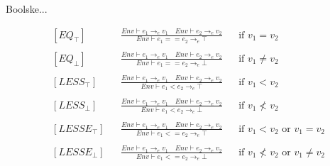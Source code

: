 \noindent Boolske...

\begin{align*}
&[EQ_\top] & &\frac{Env \vdash e_1 \rightarrow_e v_1 \quad Env \vdash e_2 \rightarrow_e v_2}{Env \vdash e_1 == e_2 \rightarrow_e \top} & &\text{if } v_1 = v_2\\\\
&[EQ_\bot] & &\frac{Env \vdash e_1 \rightarrow_e v_1 \quad Env \vdash e_2 \rightarrow_e v_2}{Env \vdash e_1 == e_2 \rightarrow_e \bot} & &\text{if } v_1 \ne v_2\\\\
&[LESS_\top] & &\frac{Env \vdash e_1 \rightarrow_e v_1 \quad Env \vdash e_2 \rightarrow_e v_2}{Env \vdash e_1 < e_2 \rightarrow_e \top} & &\text{if } v_1 < v_2\\\\
&[LESS_\bot] & &\frac{Env \vdash e_1 \rightarrow_e v_1 \quad Env \vdash e_2 \rightarrow_e v_2}{Env \vdash e_1 < e_2 \rightarrow_e \bot} & &\text{if } v_1 \nless v_2\\\\
&[LESSE_\top] & &\frac{Env \vdash e_1 \rightarrow_e v_1 \quad Env \vdash e_2 \rightarrow_e v_2}{Env \vdash e_1 <= e_2 \rightarrow_e \top} & &\text{if } v_1 < v_2 \text{ or } v_1 = v_2\\\\
&[LESSE_\bot] & &\frac{Env \vdash e_1 \rightarrow_e v_1 \quad Env \vdash e_2 \rightarrow_e v_2}{Env \vdash e_1 <= e_2 \rightarrow_e \bot} & &\text{if } v_1 \nless v_2 \text{ or } v_1 \ne v_2\\\\
\end{align*}